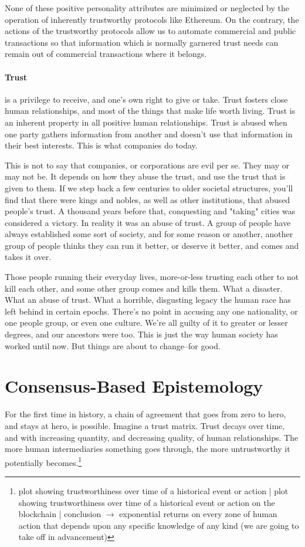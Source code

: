 \documentclass[a4paper,oneside]{article}
\begin{document}
\begin{multicols}{2}
None of these positive personality attributes are minimized or neglected by the operation of inherently trustworthy protocols like Ethereum. On the contrary, the actions of the trustworthy protocols allow us to automate commercial and public transactions so that information which is normally garnered trust needs can remain out of commercial transactions where it belongs.

\paragraph{Trust} is a privilege to receive, and one's own right to give or take. Trust fosters close human relationships, and most of the things that make life worth living. Trust is an inherent property in all positive human relationships. Trust is abused when one party gathers information from another and doesn't use that information in their best interests. This is what companies do today.

This is not to say that companies, or corporations are evil per se. They may or may not be. It depends on how they abuse the trust, and use the trust that is given to them. If we step back a few centuries to older societal structures, you'll find that there were kings and nobles, as well as other institutions, that abused people's trust. A thousand years before that, conquesting and "taking" cities was considered a victory. In reality it was an abuse of trust. A group of people have always established some sort of society, and for some reason or another, another group of people thinks they can run it better, or deserve it better, and comes and takes it over.

Those people running their everyday lives, more-or-less trusting each other to not kill each other, and some other group comes and kills them. What a disaster. What an abuse of trust. What a horrible, disgusting legacy the human race has left behind in certain epochs. There's no point in accusing any one nationality, or one people group, or even one culture. We're all guilty of it  to greater or lesser degrees, and our ancestors were too. This is just the way human society has worked until now. But things are about to change--for good.

\section{Consensus-Based Epistemology}

For the first time in history, a chain of agreement that goes from zero to hero, and stays at hero, is possible. Imagine a trust matrix. Trust decays over time, and with increasing quantity, and decreasing quality, of human relationships. The more human intermediaries something goes through, the more untrustworthy it potentially becomes.\footnote{plot showing trustworthiness over time of a historical event or action | plot showing trustworthiness over time of a historical event or action on the blockchain | conclusion $\rightarrow$ exponential returns on every zone of human action that depends upon any specific knowledge of any kind (we are going to take off in advancement)}


\end{multicols}
\end{document}

